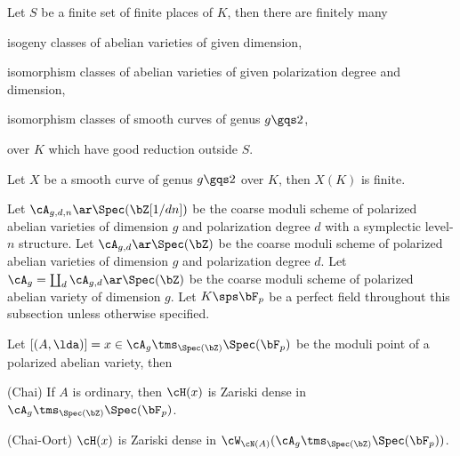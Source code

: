 \documentclass[a4paper, twoside]{article}
\begin{document}
\begin{thm}
	Let $S$ be a finite set of finite places of $K$, then there are finitely many
	\begin{enr}
		\item isogeny classes of abelian varieties of given dimension,
		\item isomorphism classes of abelian varieties of given polarization degree and dimension,
		\item isomorphism classes of smooth curves of genus $g\gqs2$,
	\end{enr}
	over $K$ which have good reduction outside $S$.
\end{thm}

\begin{thm}
	Let $X$ be a smooth curve of genus $g\gqs2$ over $K$, then $X(K)$ is finite.
\end{thm}





\begin{stp}
	Let $\cA_{g,d,n}\ar\Spec(\bZ[1/dn])$ be the coarse moduli scheme of polarized abelian varieties of dimension $g$ and polarization degree $d$ with a symplectic level-$n$ structure. Let $\cA_{g,d}\ar\Spec(\bZ)$ be the coarse moduli scheme of polarized abelian varieties of dimension $g$ and polarization degree $d$. Let $\cA_{g}=\coprod_{d}\cA_{g,d}\ar\Spec(\bZ)$ be the coarse moduli scheme of polarized abelian variety of dimension $g$. Let $K\sps\bF_{p}$ be a perfect field throughout this subsection unless otherwise specified.
\end{stp}


\begin{thm}[{\cite[1.8, 1.13]{CO2009}}]
	Let $[(A,\lda)]=x\in\cA_{g}\tms_{\Spec(\bZ)}\Spec(\bF_{p})$ be the moduli point of a polarized abelian variety, then
	\begin{enr}
			\item (Chai) If $A$ is ordinary, then $\cH(x)$ is Zariski dense in $\cA_{g}\tms_{\Spec(\bZ)}\Spec(\bF_{p})$.
			\item (Chai-Oort) $\cH(x)$ is Zariski dense in $\cW_{\cN(A)}(\cA_{g}\tms_{\Spec(\bZ)}\Spec(\bF_{p}))$.
	\end{enr}
\end{thm}
\end{document}
